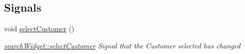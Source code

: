 \subsection*{Signals}
\begin{DoxyCompactItemize}
\item 
\hypertarget{classGui_1_1Widgets_1_1searchWidget_a9b6248c515bac4b6f58237c2f73d804b}{void \hyperlink{classGui_1_1Widgets_1_1searchWidget_a9b6248c515bac4b6f58237c2f73d804b}{select\-Customer} ()}\label{classGui_1_1Widgets_1_1searchWidget_a9b6248c515bac4b6f58237c2f73d804b}

\begin{DoxyCompactList}\small\item\em \hyperlink{classGui_1_1Widgets_1_1searchWidget_a96ba18927785257377dcd3701d41e8d1}{search\-Widget\-::select\-Customer} Signal that the Customer selected has changed \end{DoxyCompactList}\end{DoxyCompactItemize}
